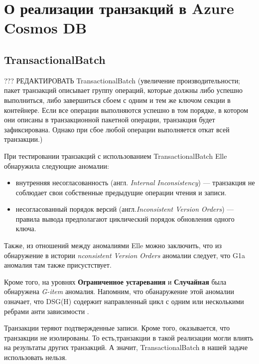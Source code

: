 \documentclass[12pt,  openany]{book}
\begin{document}
\section{О реализации транзакций в Azure Cosmos DB}
\subsection{TransactionalBatch}
??? РЕДАКТИРОВАТЬ
TransactionalBatch (увеличение производительности; пакет транзакций описывает группу операций, которые должны либо успешно выполниться, либо завершиться сбоем с одним и тем же ключом секции в контейнере. Если все операции выполняются успешно в том порядке, в котором они описаны в транзакционной пакетной операции, транзакция будет зафиксирована. Однако при сбое любой операции выполняется откат всей транзакции.)

При тестировании транзакций с использованием TransactionalBatch Elle обнаружила следующие аномалии:
\begin{itemize}
\item внутренняя несогласованность (англ. \textit{Internal Inconsistency}) --- транзакция не соблюдает свои собственные предыдущие операции чтения и записи.
\item несогласованный порядок версий (англ.\textit{Inconsistent Version Orders}) --- правила вывода предполагают циклический порядок обновления одного ключа.
\end{itemize}

Также, из отношений между аномалиями Elle\cite{Kingsbury2020ElleII} можно заключить, что из обнаружение в истории  \textit{nconsistent Version Orders} аномалии следует, что G1a аномалия там также присустствует.
\par
Кроме того, на уровнях \textbf{Ограниченное устаревания} и \textbf{Случайная} была обнаружена \textit{G-item} аномалия. 
Напомним, что обанаружение этой аномалии означает, что DSG(H) содержит направленный цикл с одним или несколькими ребрами анти зависимости \cite{IsolationLevelDefinitions}.

Транзакции теряют подтвержденные записи.  Кроме того, оказывается, что транзакции не изолированы. То есть,транзакции в такой реализации могли влиять на результаты других транзакций.
А значит, TransactionalBatch в нашей задаче использовать нельзя.
\end{document}
